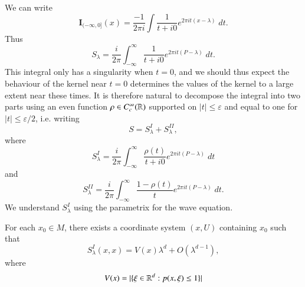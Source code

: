 
We can write
%
\[ \mathbf{I}_{(-\infty,0]}(x) = \frac{-1}{2 \pi i} \int \frac{1}{t + i 0} e^{2 \pi i t (x - \lambda)}\; dt. \]
%
Thus
%
\[ S_\lambda = \frac{i}{2 \pi} \int_{-\infty}^\infty \frac{1}{t + i 0} e^{2 \pi i t (P - \lambda)}\; dt. \]
%
This integral only has a singularity when $t = 0$, and we should thus expect the behaviour of the kernel near $t = 0$ determines the values of the kernel to a large extent near these times. It is therefore natural to decompose the integral into two parts using an even function $\rho \in C_c^\infty(\operatorname{\mathbb{R}})$ supported on $|t| \leq \varepsilon$ and equal to one for $|t| \leq \varepsilon / 2$, i.e. writing
%
\[ S = S_\lambda^I + S_\lambda^{II}, \]
    where
    \[ S_\lambda^I = \frac{i}{2 \pi} \int_{-\infty}^\infty \frac{\rho(t)}{t + i0} e^{2 \pi i t (P - \lambda)}\; dt \]
    and
    \[ S_\lambda^{II} = \frac{i}{2 \pi} \int_{-\infty}^\infty \frac{1 - \rho(t)}{t} e^{2 \pi i t (P - \lambda)}\; dt. \]
    We understand $S_\lambda^I$ using the parametrix for the wave equation. 

\begin{lemma}
    For each $x_0 \in M$, there exists a coordinate system $(x,U)$ containing $x_0$ such that
    \[ S_\lambda^I(x,x) = V(x) \lambda^d  + O(\lambda^{d-1}), \]
    where
    \[ V(x) = |\{ \xi \in \operatorname{\mathbb{R}}^d : p(x,\xi) \leq 1 \}| \]
\end{lemma}

